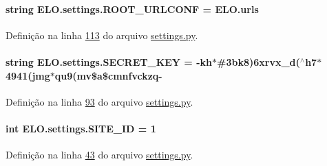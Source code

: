 \paragraph[{R\+O\+O\+T\+\_\+\+U\+R\+L\+C\+O\+N\+F}]{\setlength{\rightskip}{0pt plus 5cm}string E\+L\+O.\+settings.\+R\+O\+O\+T\+\_\+\+U\+R\+L\+C\+O\+N\+F = \textquotesingle{}E\+L\+O.\+urls\textquotesingle{}}\label{namespaceELO_1_1settings_a9c32eb39b369ab243858f8bd495e698b}


Definição na linha \hyperlink{settings_8py_source_l00113}{113} do arquivo \hyperlink{settings_8py_source}{settings.\+py}.

\hypertarget{namespaceELO_1_1settings_a13a984a190c7599ab7343322ab098d6d}{}
\paragraph[{S\+E\+C\+R\+E\+T\+\_\+\+K\+E\+Y}]{\setlength{\rightskip}{0pt plus 5cm}string E\+L\+O.\+settings.\+S\+E\+C\+R\+E\+T\+\_\+\+K\+E\+Y = \textquotesingle{}-\/kh$\ast$\#3bk8)6xrvx\+\_\+d($^\wedge$h7$\ast$4941(jmg$\ast$qu9(mv\$a\$cmnfvckzq-\/\textquotesingle{}}\label{namespaceELO_1_1settings_a13a984a190c7599ab7343322ab098d6d}


Definição na linha \hyperlink{settings_8py_source_l00093}{93} do arquivo \hyperlink{settings_8py_source}{settings.\+py}.

\hypertarget{namespaceELO_1_1settings_a31328123344da3768e97b0ac61c342de}{}
\paragraph[{S\+I\+T\+E\+\_\+\+I\+D}]{\setlength{\rightskip}{0pt plus 5cm}int E\+L\+O.\+settings.\+S\+I\+T\+E\+\_\+\+I\+D = 1}\label{namespaceELO_1_1settings_a31328123344da3768e97b0ac61c342de}


Definição na linha \hyperlink{settings_8py_source_l00043}{43} do arquivo \hyperlink{settings_8py_source}{settings.\+py}.

\hypertarget{namespaceELO_1_1settings_ae5539527ada0171fc602c561493398f4}{}
